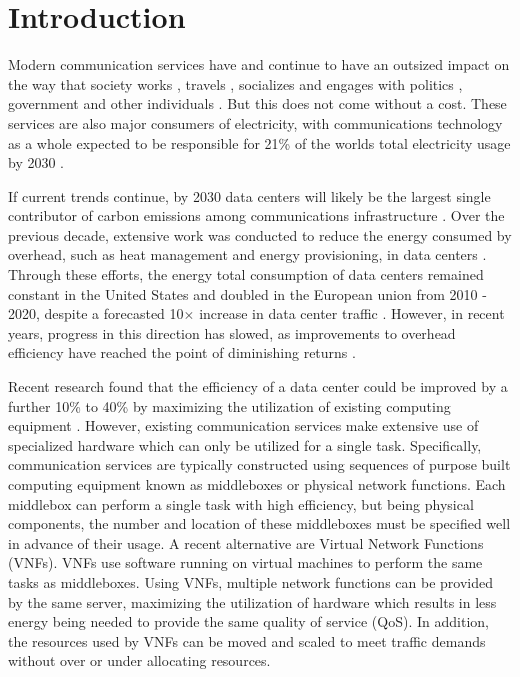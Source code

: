 \section{Introduction}
Modern communication services have and continue to have an outsized impact on the way that society works \cite{OECD16}, travels \cite{ZhengMF15}, socializes \cite{Bargh04} and engages with politics \cite{Farrell12}, government \cite{ChadwickM13} and other individuals \cite{Castells14}. But this does not come without a cost. These services are also major consumers of electricity, with communications technology as a whole expected to be responsible for 21\% of the worlds total electricity usage by 2030 \cite{AndraeE15}.

If current trends continue, by 2030 data centers will likely be the largest single contributor of carbon emissions among communications infrastructure \cite{AndraeE15}. Over the previous decade, extensive work was conducted to reduce the energy consumed by overhead, such as heat management and energy provisioning, in data centers \cite{AvgerinouBC17}. Through these efforts, the energy total consumption of data centers remained constant in the United States \cite{Shehabi18} and doubled in the European union \cite{DoddAGC20} from 2010 - 2020, despite a forecasted 10$\times$ increase in data center traffic \cite{Cisco18}. However, in recent years, progress in this direction has slowed, as improvements to overhead efficiency have reached the point of diminishing returns \cite{Google21}.

Recent research found that the efficiency of a data center could be improved by a further 10\% to 40\% by maximizing the utilization of existing computing equipment \cite{DoddAGC20,ShehabiARSSD16}. However, existing communication services make extensive use of specialized hardware which can only be utilized for a single task. Specifically, communication services are typically constructed using sequences of purpose built computing equipment known as middleboxes or physical network functions. Each middlebox can perform a single task with high efficiency, but being physical components, the number and location of these middleboxes must be specified well in advance of their usage. A recent alternative are Virtual Network Functions (VNFs). VNFs use software running on virtual machines to perform the same tasks as middleboxes. Using VNFs, multiple network functions can be provided by the same server, maximizing the utilization of hardware which results in less energy being needed to provide the same quality of service (QoS). In addition, the resources used by VNFs can be moved and scaled to meet traffic demands without over or under allocating resources.

